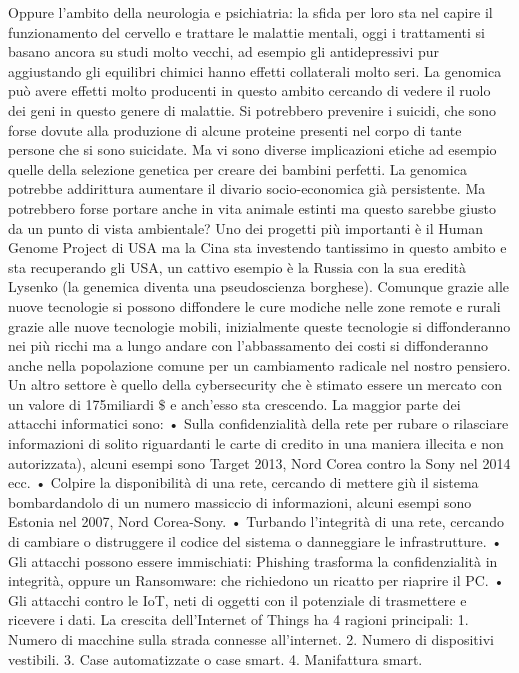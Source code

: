 \documentclass[11pt, a4page, twocolumn]{article}
\begin{document}
Oppure l’ambito della neurologia e psichiatria: la sfida per loro sta nel capire il funzionamento del cervello e trattare le malattie mentali, oggi i trattamenti si basano ancora su studi molto vecchi, ad esempio gli antidepressivi pur aggiustando gli equilibri chimici hanno effetti collaterali molto seri. La genomica può avere effetti molto producenti in questo ambito cercando di vedere il ruolo dei geni in questo genere di malattie. Si potrebbero prevenire i suicidi, che sono forse dovute alla produzione di alcune proteine presenti nel corpo di tante persone che si sono suicidate.
Ma vi sono diverse implicazioni etiche ad esempio quelle della selezione genetica per creare dei bambini perfetti. La genomica potrebbe addirittura aumentare il divario socio-economica già persistente. Ma potrebbero forse portare anche in vita animale estinti ma questo sarebbe giusto da un punto di vista ambientale? 
Uno dei progetti più importanti è il Human Genome Project di USA ma la Cina sta investendo tantissimo in questo ambito e sta recuperando gli USA, un cattivo esempio è la Russia con la sua eredità Lysenko (la genemica diventa una pseudoscienza borghese). Comunque grazie alle nuove tecnologie si possono diffondere le cure modiche nelle zone remote e rurali grazie alle nuove tecnologie mobili, inizialmente queste tecnologie si diffonderanno nei più ricchi ma a lungo andare con l’abbassamento dei costi si diffonderanno anche nella popolazione comune per un cambiamento radicale nel nostro pensiero.
Un altro settore è quello della cybersecurity che è stimato essere un mercato con un valore di 175miliardi $\$$ e anch’esso sta crescendo. La maggior parte dei attacchi informatici sono:
    • Sulla confidenzialità della rete per rubare o rilasciare informazioni di solito riguardanti le carte di credito in una maniera illecita e non autorizzata), alcuni esempi sono Target 2013, Nord Corea contro la Sony nel 2014 ecc.
    • Colpire la disponibilità di una rete, cercando di mettere giù il sistema bombardandolo di un numero massiccio di informazioni, alcuni esempi sono Estonia nel 2007, Nord Corea-Sony.
    • Turbando l’integrità di una rete, cercando di cambiare o distruggere il codice del sistema o danneggiare le infrastrutture.
    • Gli attacchi possono essere immischiati: Phishing trasforma la confidenzialità in integrità, oppure un Ransomware: che richiedono un ricatto per riaprire il PC.
    • Gli attacchi contro le IoT, neti di oggetti con il potenziale di trasmettere e ricevere i dati.
La crescita dell’Internet of Things ha 4 ragioni principali:
     1. Numero di macchine sulla strada connesse all’internet.
     2. Numero di dispositivi vestibili.
     3. Case automatizzate o case smart.
     4. Manifattura smart.
\end{document}
